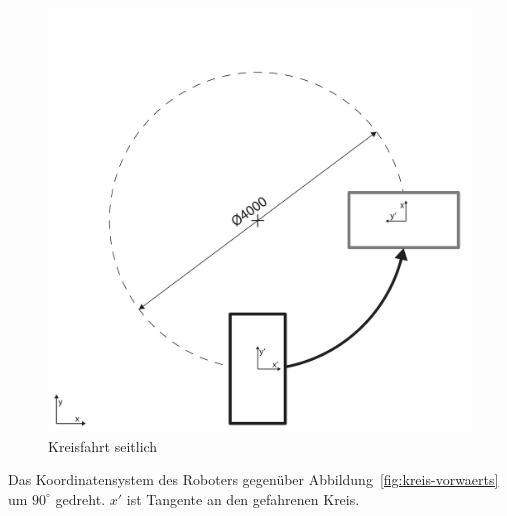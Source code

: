 \begin{figure}[H]
    \centering
    \includegraphics[width=.6\textwidth]{Abbildungen/Viertelkreis-seitwaerts}
    \caption{Kreisfahrt seitlich}
    \label{fig:kreis-seitwaerts}
\end{figure}
Das Koordinatensystem des Roboters gegenüber Abbildung~\ref{fig:kreis-vorwaerts} um $90^\circ$ gedreht. $x'$ ist Tangente an den gefahrenen Kreis.
